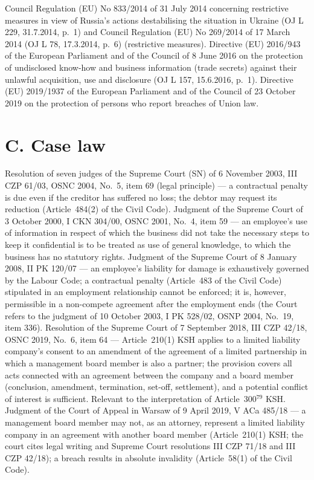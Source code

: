 \begin{BibList}
 Council Regulation (EU) No 833/2014 of 31 July 2014 concerning restrictive measures in view of Russia's actions destabilising the situation in Ukraine (OJ L 229, 31.7.2014, p.~1) and Council Regulation (EU) No 269/2014 of 17 March 2014 (OJ L 78, 17.3.2014, p.~6) (restrictive measures).
 Directive (EU) 2016/943 of the European Parliament and of the Council of 8 June 2016 on the protection of undisclosed know-how and business information (trade secrets) against their unlawful acquisition, use and disclosure (OJ L 157, 15.6.2016, p.~1).
 Directive (EU) 2019/1937 of the European Parliament and of the Council of 23 October 2019 on the protection of persons who report breaches of Union law.
\end{BibList}

\section*{C. Case law}
\begin{BibList}
 Resolution of seven judges of the Supreme Court (SN) of 6 November 2003, III CZP 61/03, OSNC 2004, No.~5, item 69 (legal principle) --- a contractual penalty is due even if the creditor has suffered no loss; the debtor may request its reduction (Article~484(2) of the Civil Code).
 Judgment of the Supreme Court of 3 October 2000, I CKN 304/00, OSNC 2001, No.~4, item 59 --- an employee's use of information in respect of which the business did not take the necessary steps to keep it confidential is to be treated as use of general knowledge, to which the business has no statutory rights.
 Judgment of the Supreme Court of 8 January 2008, II PK 120/07 --- an employee's liability for damage is exhaustively governed by the Labour Code; a contractual penalty (Article~483 of the Civil Code) stipulated in an employment relationship cannot be enforced; it is, however, permissible in a non-compete agreement after the employment ends (the Court refers to the judgment of 10 October 2003, I PK 528/02, OSNP 2004, No.~19, item 336).
 Resolution of the Supreme Court of 7 September 2018, III CZP 42/18, OSNC 2019, No.~6, item 64 --- Article~210(1) KSH applies to a limited liability company's consent to an amendment of the agreement of a limited partnership in which a management board member is also a partner; the provision covers all acts connected with an agreement between the company and a board member (conclusion, amendment, termination, set-off, settlement), and a potential conflict of interest is sufficient. Relevant to the interpretation of Article~300$^{79}$ KSH.
 Judgment of the Court of Appeal in Warsaw of 9 April 2019, V ACa 485/18 --- a management board member may not, as an attorney, represent a limited liability company in an agreement with another board member (Article~210(1) KSH; the court cites legal writing and Supreme Court resolutions III CZP 71/18 and III CZP 42/18); a breach results in absolute invalidity (Article~58(1) of the Civil Code).
\end{BibList}

